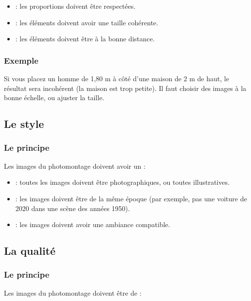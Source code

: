 \begin{itemize}
    \item {} : les proportions doivent être respectées.
    \item {} : les éléments doivent avoir une taille cohérente.
    \item {} : les éléments doivent être à la bonne distance.
\end{itemize}

\subsubsection{Exemple}

Si vous placez un homme de 1,80 m à côté d'une maison de 2 m de haut, le résultat sera incohérent (la maison est trop petite). Il faut choisir des images à la bonne échelle, ou ajuster la taille.

\subsection{Le style}

\subsubsection{Le principe}

Les images du photomontage doivent avoir un  :

\begin{itemize}
    \item {} : toutes les images doivent être photographiques, ou toutes illustratives.
    \item {} : les images doivent être de la même époque (par exemple, pas une voiture de 2020 dans une scène des années 1950).
    \item {} : les images doivent avoir une ambiance compatible.
\end{itemize}

\subsection{La qualité}

\subsubsection{Le principe}

Les images du photomontage doivent être de  :

